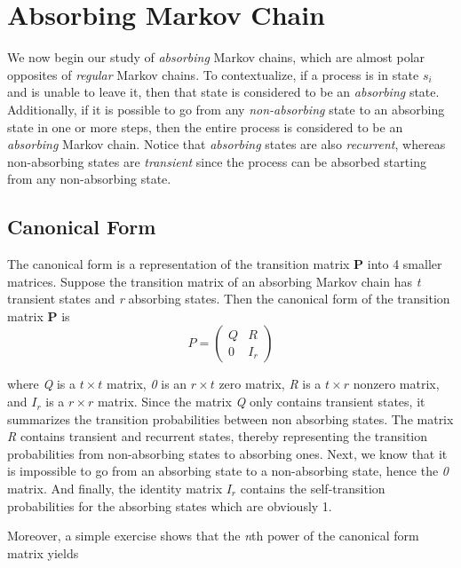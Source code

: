 \documentclass[a4paper, 12pt]{article}
\begin{document}
\section*{Absorbing Markov Chain}

	We now begin our study of \textit{absorbing} Markov chains, which are almost polar opposites of \textit{regular} Markov chains. To contextualize, if a process is in state $s_i$ and is unable to leave it, then that state is considered to be an \emph{absorbing} state. Additionally, if it is possible to go from any \textit{non-absorbing} state to an absorbing state in one or more steps, then the entire process is considered to be an \emph{absorbing} Markov chain. Notice that \textit{absorbing} states are also \textit{recurrent}, whereas non-absorbing states are \textit{transient} since the process can be absorbed starting from any non-absorbing state.	
	
	\subsection*{Canonical Form}
	
The canonical form is a representation of the transition matrix \textbf{P} into 4 smaller matrices. Suppose the transition matrix of an absorbing Markov chain has \textit{t} transient states and \textit{r} absorbing states. Then the canonical form of the transition matrix \textbf{P} is
	 \[
    P = \left(
    \begin{array}{c|c}
      Q & R\\
      \hline
      0 & I_r
    \end{array}
    \right)
  \]
  
where \textit{Q} is a $t \times t$ matrix, \textit{0} is an $r \times t$ zero matrix, \textit{R} is a $t \times r$ nonzero matrix, and $I_r$ is a $r \times r$ matrix. Since the matrix \textit{Q} only contains transient states, it summarizes the transition probabilities between non absorbing states. The matrix \textit{R} contains transient and recurrent states, thereby representing the transition probabilities from non-absorbing states to absorbing ones. Next, we know that it is impossible to go from an absorbing state to a non-absorbing state, hence the \textit{0} matrix. And finally, the identity matrix $I_r$ contains the self-transition probabilities for the absorbing states which are obviously 1.

Moreover, a simple exercise shows that the \textit{n}th power of the canonical form matrix yields
\end{document}
